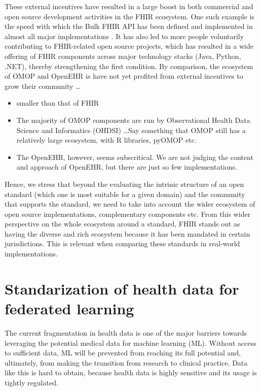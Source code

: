 \documentclass[
  authoryear]{elsarticle}
\providecommand{\tightlist}{%
  \setlength{\itemsep}{0pt}\setlength{\parskip}{0pt}}\usepackage{longtable,booktabs,array}
\begin{document}
These external incentives have resulted in a large boost in both
commercial and open source development activities in the FHIR ecosystem.
One such example is the speed with which the Bulk FHIR API has been
defined and implemented in almost all major implementations
\citep{mandl2020push, jones2021landscape}. It has also led to more
people voluntarily contributing to FHIR-related open source projects,
which has resulted in a wide offering of FHIR components across major
technology stacks (Java, Python, .NET), thereby strengthening the first
condition. By comparison, the ecosystem of OMOP and OpenEHR is have not
yet profited from external incentives to grow their community \ldots{}

\begin{itemize}
\tightlist
\item
  smaller than that of FHIR
\item
  The majority of OMOP components are run by Observational Health Data
  Science and Informatics (OHDSI) \ldots Say something that OMOP still
  has a relatively large ecosystem, with R libraries, pyOMOP etc.
\item
  The OpenEHR, however, seems subscritical. We are not judging the
  content and approach of OpenEHR, but there are just so few
  implementations.
\end{itemize}

Hence, we stress that beyond the evaluating the intrinic structure of an
open standard (which one is most suitable for a given domain) and the
community that supports the standard, we need to take into account the
wider ecosystem of open source implementations, complementary components
etc. From this wider perspective on the whole ecosystem around a
standard, FHIR stands out as having the diverse and rich ecosystem
because it has been mandated in certain jurisdictions. This is relevant
when comparing these standards in real-world implementations.

\section{Standarization of health data for federated
learning}\label{standarization-of-health-data-for-federated-learning}

The current fragmentation in health data is one of the major barriers
towards leveraging the potential medical data for machine learning (ML).
Without access to sufficient data, ML will be prevented from reaching
its full potential and, ultimately, from making the transition from
research to clinical practice. Data like this is hard to obtain, because
health data is highly sensitive and its usage is tightly regulated.
\end{document}
